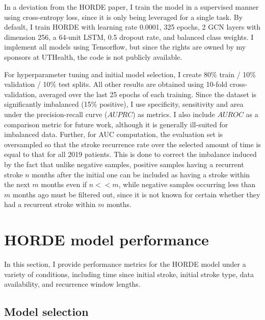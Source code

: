 \documentclass{article}
\begin{document}
In a deviation from the HORDE paper, I train the model in a supervised manner using cross-entropy loss, since it is only being leveraged for a single task. By default, I train HORDE with learning rate 0.0001, 325 epochs, 2 GCN layers with dimension 256, a 64-unit LSTM, 0.5 dropout rate, and balanced class weights. I implement all models using Tensorflow, but since the rights are owned by my sponsors at UTHealth, the code is not publicly available. 

For hyperparameter tuning and initial model selection, I create 80\% train / 10\% validation / 10\% test splits. All other results are obtained using 10-fold cross-validation, averaged over the last 25 epochs of each training. Since the dataset is significantly imbalanced (15\% positive), I use specificity, sensitivity and area under the precision-recall curve ($AUPRC$) as metrics. I also include $AUROC$ as a comparison metric for future work, although it is generally ill-suited for imbalanced data. Further, for AUC computation, the evaluation set is oversampled so that the stroke recurrence rate over the selected amount of time is equal to that for all 2019 patients. This is done to correct the imbalance induced by the fact that unlike negative samples, positive samples having a recurrent stroke $n$ months after the initial one can be included as having a stroke within the next $m$ months even if $n << m$, while negative samples occurring less than $m$ months ago must be filtered out, since it is not known for certain whether they had a recurrent stroke within $m$ months.


\section{HORDE model performance}

In this section, I provide performance metrics for the HORDE model under a variety of conditions, including time since initial stroke, initial stroke type, data availability, and recurrence window lengths.

\subsection{Model selection}
\end{document}
